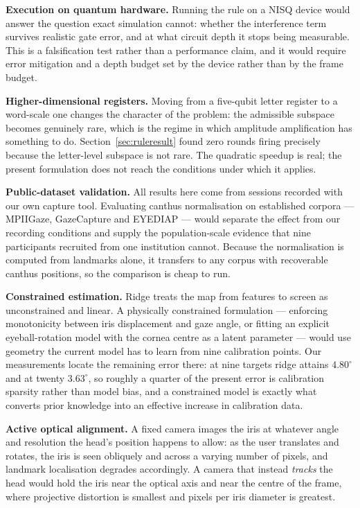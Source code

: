 \documentclass[conference]{IEEEtran}
\begin{document}
\textbf{Execution on quantum hardware.} Running the rule on a NISQ device would
answer the question exact simulation cannot: whether the interference term
survives realistic gate error, and at what circuit depth it stops being
measurable. This is a falsification test rather than a performance claim, and it
would require error mitigation and a depth budget set by the device rather than
by the frame budget.

\textbf{Higher-dimensional registers.} Moving from a five-qubit letter register
to a word-scale one changes the character of the problem: the admissible
subspace becomes genuinely rare, which is the regime in which amplitude
amplification has something to do. Section~\ref{sec:ruleresult} found zero rounds
firing precisely because the letter-level subspace is not rare. The quadratic
speedup is real; the present formulation does not reach the conditions under
which it applies.

\textbf{Public-dataset validation.} All results here come from sessions recorded
with our own capture tool. Evaluating canthus normalisation on established
corpora --- MPIIGaze, GazeCapture and EYEDIAP --- would separate the effect from
our recording conditions and supply the population-scale evidence that nine
participants recruited from one institution cannot. Because the normalisation
is computed from
landmarks alone, it transfers to any corpus with recoverable canthus positions,
so the comparison is cheap to run.

\textbf{Constrained estimation.} Ridge treats the map from features to screen as
unconstrained and linear. A physically constrained formulation --- enforcing
monotonicity between iris displacement and gaze angle, or fitting an explicit
eyeball-rotation model with the cornea centre as a latent parameter --- would use
geometry the current model has to learn from nine calibration points. Our
measurements locate the remaining error there: at nine targets ridge attains
$4.80^\circ$ and at twenty $3.63^\circ$, so roughly a quarter of the present
error is calibration sparsity rather than model bias, and a constrained model is
exactly what converts prior knowledge into an effective increase in calibration
data.

\textbf{Active optical alignment.} A fixed camera images the iris at whatever
angle and resolution the head's position happens to allow: as the user
translates and rotates, the iris is seen obliquely and across a varying number
of pixels, and landmark localisation degrades accordingly. A camera that instead \emph{tracks} the head would
hold the iris near the optical axis and near the centre of the frame, where
projective distortion is smallest and pixels per iris diameter is greatest.
\end{document}
